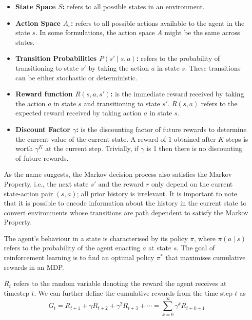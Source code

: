 \documentclass[11pt,a4paper]{report}
\begin{document}
\begin{itemize}
  \item \textbf{State Space $S$:} refers to all possible states in an environment.  
  \item \textbf{Action Space $A_s$:} refers to all possible actions available to the agent in the state $s$. In some formulations, the action space $A$ might be the same across states. 
  \item \textbf{Transition Probabilities $P(s' \mid s, a)$:} refers to the probability of transitioning to state $s'$ by taking the action $a$ in state $s$. These transitions can be either stochastic or deterministic.   
  \item \textbf{Reward function $R(s, a, s')$:} is the immediate reward received by taking the action $a$ in state $s$ and transitioning to state $s'$. $R(s, a)$ refers to the expected reward received by taking action $a$ in state $s$.  
  \item \textbf{Discount Factor $\gamma$:} is the discounting factor of future rewards to determine the current value of the current state. A reward of $1$ obtained after $K$ steps is worth $\gamma^K$ at the current step. Trivially, if $\gamma$ is 1 then there is no discounting of future rewards.    
\end{itemize} \par

As the name suggests, the Markov decision process also satisfies the Markov Property, i.e., the next state $s'$ and the reward $r$ only depend on the current state-action pair $(s, a)$; all prior history is irrelevant. It is important to note that it is possible to encode information about the history in the current state to convert environments whose transitions are path dependent to satisfy the Markov Property. \par

The agent's behaviour in a state is characterised by its policy $\pi$, where $\pi(a \mid s)$ refers to the probability of the agent enacting $a$ at state $s$. The goal of reinforcement learning is to find an optimal policy $\pi^*$ that maximises cumulative rewards in an MDP. \par

$R_{t}$ refers to the random variable denoting the reward the agent receives at timestep $t$. We can further define the cumulative rewards from the time step $t$ as 
\[G_t = R_{t+1} + \gamma R_{t+2} + \gamma^2 R_{t+3} + \cdots = \sum_{k=0}^{\infty} \gamma^k R_{t+k+1}\] \par
\end{document}

